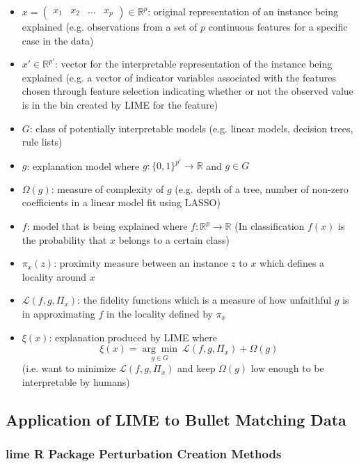 \documentclass[AMS,STIX2COL]{WileyNJD-v2}
\begin{document}
\begin{itemize}
\item $x=\left(\begin{array}{cccc}x_1 & x_2 & \hdots & x_p\end{array}\right)\in\mathbb{R}^p$: original representation of an instance being explained (e.g. observations from a set of $p$ continuous features for a specific case in the data) %
\item $x'\in\mathbb{R}^{p'}$: vector for the interpretable representation of the instance being explained (e.g. a vector of indicator variables associated with the features chosen through feature selection indicating whether or not the observed value is in the bin created by LIME for the feature)
\item $G$: class of potentially interpretable models (e.g. linear models, decision trees, rule lists)
\item $g$: explanation model where $g:\{0,1\}^{p'}\rightarrow\mathbb{R}$ and $g\in G$
\item $\Omega(g)$: measure of complexity of $g$ (e.g. depth of a tree, number of non-zero coefficients in a linear model fit using LASSO)
\item $f$: model that is being explained where $f:\mathbb{R}^p\rightarrow\mathbb{R}$ (In classification $f(x)$ is the probability that $x$ belongs to a certain class)
\item $\pi_x(z)$: proximity measure between an instance $z$ to $x$ which defines a locality around $x$
\item $\mathcal{L}(f, g, \Pi_x)$: the fidelity functions which is a measure of how unfaithful $g$ is in approximating $f$ in the locality defined by $\pi_x$
\item $\xi(x)$: explanation produced by LIME where
  $$\xi(x)=\underset{g\in G}{\arg\min} \ \mathcal{L}(f, g, \Pi_x)+\Omega(g)$$
(i.e. want to minimize $\mathcal{L}(f, g, \Pi_x)$ and keep $\Omega(g)$ low enough to be interpretable by humans)
\end{itemize}

\subsection{Application of LIME to Bullet Matching Data}

\subsubsection{lime R Package Perturbation Creation Methods}
\end{document}
